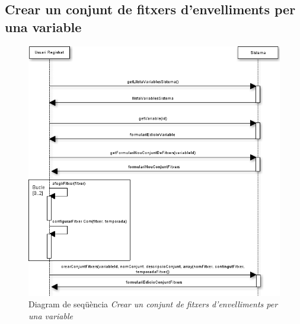 \subsection*{Crear un conjunt de fitxers d'envelliments per una variable}
\begin{figure}[H]
  \centering
  \includegraphics[scale=0.6]{img/specification/SequenceNewSeasonSe.png}
  \caption{Diagram de seqüència \textit{Crear un conjunt de fitxers d'envelliments per una variable}}
  \label{fig:sequencenewseasonset}
\end{figure}

